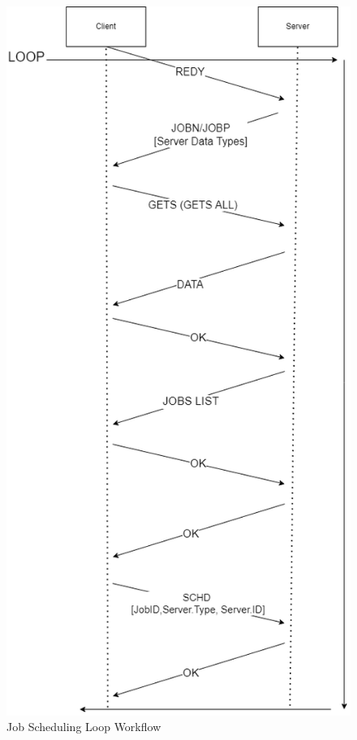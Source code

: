 \documentclass[a4paper]{article} %
\begin{document}
\begin{figure}[H]
\begin{center}
\includegraphics[scale=0.3]{Client-server LOOP.drawio.png}
\caption{Job Scheduling Loop Workflow}
\end{center}
\end{figure}
\end{document}
